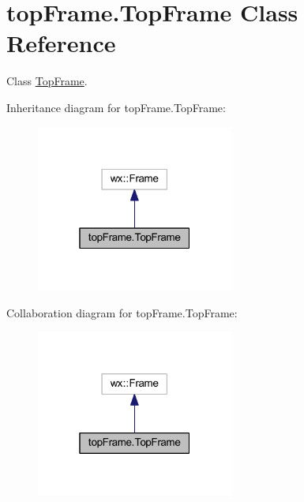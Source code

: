 \hypertarget{classtop_frame_1_1_top_frame}{\section{top\-Frame.\-Top\-Frame Class Reference}
\label{classtop_frame_1_1_top_frame}
}


Class \hyperlink{classtop_frame_1_1_top_frame}{Top\-Frame}.  




Inheritance diagram for top\-Frame.\-Top\-Frame\-:
\nopagebreak
\begin{figure}[H]
\begin{center}
\leavevmode
\includegraphics[width=184pt]{classtop_frame_1_1_top_frame__inherit__graph}
\end{center}
\end{figure}


Collaboration diagram for top\-Frame.\-Top\-Frame\-:
\nopagebreak
\begin{figure}[H]
\begin{center}
\leavevmode
\includegraphics[width=184pt]{classtop_frame_1_1_top_frame__coll__graph}
\end{center}
\end{figure}
